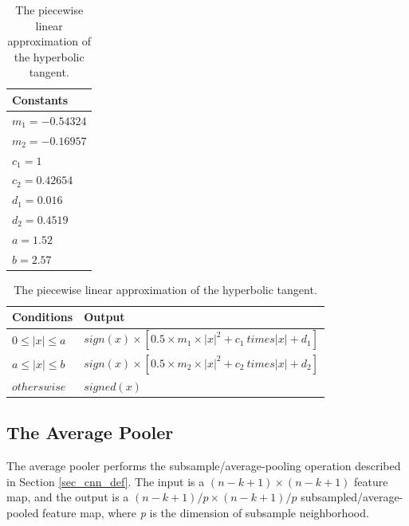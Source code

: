 \begin{table}
	\centering
    \begin{tabular}{| >{\centering\arraybackslash}m{1.2in} |} 
    \hline
    Constants \\ \hline
    $ m_1 = -0.54324 $ \\ \hline
    $ m_2 = -0.16957 $ \\ \hline
    $ c_1 = 1 $ \\ \hline
    $ c_2 = 0.42654 $ \\ \hline
    $ d_1 = 0.016 $ \\ \hline
    $ d_2 = 0.4519 $ \\ \hline
    $ a = 1.52 $ \\ \hline
    $ b = 2.57 $ \\ \hline
        \end{tabular}
    \caption{The constant used for the hyperbolic tangent approximation.}
   	\label{tab_tanh_constants}
    
    
	\centering
    \begin{tabular}{| >{\centering\arraybackslash}m{1.2in} | >{\centering\arraybackslash}m{2.5in} |} 
    \hline
    Conditions & Output \\ \hline
    $ 0 \le |x| \le a $ & $ sign(x) \times [0.5 \times m_1 \times |x|^2 + c_1 \ times |x| + d_1] $\\ \hline
    $ a \le |x| \le b $ & $ sign(x) \times [0.5 \times m_2 \times |x|^2 + c_2 \ times |x| + d_2] $\\ \hline
   	$ otherswise $ & $ signed(x) $\\ \hline
        \end{tabular}
    \caption{The piecewise linear approximation of the hyperbolic tangent.}
   	\label{tab_tanh}
    
\end{table}

\vspace*{1\baselineskip}


\subsection{The Average Pooler} \label{sec_average_pooler}

The average pooler performs the subsample/average-pooling operation described in Section \ref{sec_cnn_def}. The input is a $ (n-k+1) \times (n-k+1) $ feature map, and the output is a $ (n-k+1)/p \times (n-k+1)/p $ subsampled/average-pooled feature map, where \textit{p} is the dimension of subsample neighborhood. 

